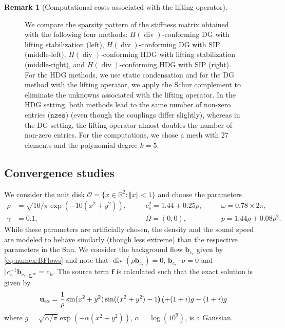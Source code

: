 \documentclass{m2an}
\newcommand{\dom}{\mathcal{O}} %
\newcommand{\nv}{\boldsymbol{\nu}}
\newcommand{\bflow}{\mathbf{b}}
\renewcommand{\u}{\mathbf{u}}
\renewcommand{\div}{\operatorname{div}}
\newcommand{\bL}{\mathbf{L}}
\newcommand{\bff}{\mathbf{f}}
\theoremstyle{plain}
\theoremstyle{definition}
\newtheorem{remark}[theorem]{Remark}
\begin{document}
\begin{remark}[Computational costs associated with the lifting operator]
\begin{figure}[!htbp]
      \caption{We compare the sparsity pattern of the stiffness matrix obtained with the following four methods: $H(\div)$-conforming DG with lifting stabilization  (left), $H(\div)$-conforming DG with SIP (middle-left), $H(\div)$-conforming HDG with lifting stabilization (middle-right), and $H(\div)$-conforming HDG with SIP (right). For the HDG methods, we use static condensation and for the DG method with the lifting operator, we apply the Schur complement to eliminate the unknowns associated with the lifting operator. In the HDG setting, both methods lead to the same number of non-zero entries ($\texttt{nzes}$) (even though the couplings differ slightly), whereas in the DG setting, the lifting operator almost doubles the number of non-zero entries.
      For the computations, we chose a mesh with $27$ elements and the polynomial degree $k = 5$.}
      \label{fig:sparsitypattern}      
   \end{figure}
\end{remark}


\subsection{Convergence studies}\label{subsec:numex:conv}
We consider the unit disk $\dom = \{ x \in \mathbb{R}^2 : \Vert x \Vert < 1 \}$ and choose the parameters 
\begin{subequations}\label{eq:Numex:parameters1}
   \begin{alignat}{3}
      \rho &= \sqrt{10/\pi} \exp(-10(x^2+y^2)), \quad &&c_s^2 = 1.44 + 0.25\rho, \quad &&\omega = 0.78 \times 2\pi, \\
      \gamma &= 0.1, &&\Omega =(0,0), && p =1.44\rho + 0.08\rho^2. 
   \end{alignat} 
\end{subequations}
While these parameters are artificially chosen, the density and the sound speed are modeled to behave similarly (though less extreme) than the respective parameters in the Sun. We consider the background flow $\bflow_{c_s}$ given by \eqref{eq:numex:BFlows} and note that $\div (\rho \bflow_{c_s}) = 0$, $\bflow_{c_s} \cdot \nv = 0$ and $\Vert c_s^{-1} \bflow_{c_s} \Vert_{\bL^\infty} = c_{\bflow}$. The source term $\bff$ is calculated such that the exact solution is given by
\begin{equation}\label{eq:num:refsol}
   \u_{\text{ex}} = \frac{1}{\rho} \sin(x^2+y^2) \sin((x^2+y^2)-1) \begin{pmatrix}
   \end{pmatrix},
      +(1+i)g \\ -(1+i)g
\end{equation}
where $g = \sqrt{\alpha/\pi} \exp(-\alpha(x^2+y^2))$, $\alpha = \log(10^9)$, is a Gaussian. 
\end{document}
